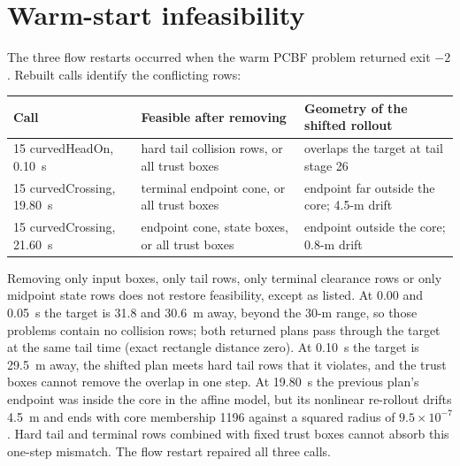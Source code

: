 \documentclass[11pt]{article}
\begin{document}
\section{Warm-start infeasibility}
The three flow restarts occurred when the warm PCBF problem returned exit $-2$.
Rebuilt calls identify the conflicting rows:
\begin{center}\footnotesize
\begin{tabular}{lll}
\toprule
Call & Feasible after removing & Geometry of the shifted rollout\\
\midrule
15 curvedHeadOn, 0.10~s & hard tail collision rows, or all trust boxes & overlaps the target at tail stage 26\\
15 curvedCrossing, 19.80~s & terminal endpoint cone, or all trust boxes & endpoint far outside the core; 4.5-m drift\\
15 curvedCrossing, 21.60~s & endpoint cone, state boxes, or all trust boxes & endpoint outside the core; 0.8-m drift\\
\bottomrule
\end{tabular}\end{center}
Removing only input boxes, only tail rows, only terminal clearance rows or only
midpoint state rows does not restore feasibility, except as listed. At 0.00 and 0.05~s
the target is 31.8 and 30.6~m away, beyond the 30-m range, so those problems
contain no collision rows; both returned plans pass through the target at the
same tail time (exact rectangle distance zero). At 0.10~s the target is 29.5~m
away, the shifted plan meets hard tail rows that it violates, and the trust
boxes cannot remove the overlap in one step. At 19.80~s the previous plan's endpoint
was inside the core in the affine model, but its nonlinear re-rollout drifts
4.5~m and ends with core membership 1196 against a squared radius of
$9.5\times10^{-7}$. Hard tail and terminal rows combined with fixed trust boxes
cannot absorb this one-step mismatch. The flow restart repaired all three
calls.
\end{document}
